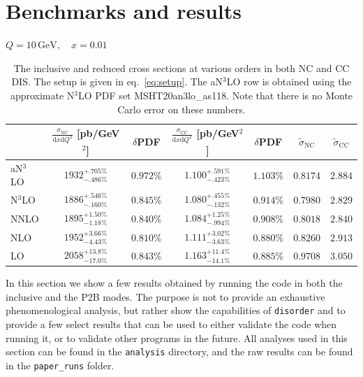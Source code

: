\documentclass[submission, PhysCodeb]{SciPost}
\newcommand{\disorder}{{\tt disorder}}
\newcommand{\dd}{\mathrm{d}}
\newcommand{\NC}{\mathrm{NC}}
\newcommand{\CC}{\mathrm{CC}}
\newcommand{\GEV}{\,\mathrm{GeV}}
\newcommand{\NNNLO}{N$^3$LO}
\begin{document}
\section{Benchmarks and results}
\label{sec:results}
\begin{table}[t] 
  \centering
  \phantom{x}\medskip
  \begin{center} $Q = 10\GEV,\quad x = 0.01$\end{center}
  {\renewcommand{\arraystretch}{1.2}
  \begin{tabular}{lcccc|cc}
    \toprule
    & $\frac{\sigma_\NC}{\dd x \dd Q^2}$ [pb/GeV$^2$] & $\delta$PDF & $\frac{\sigma_\CC}{\dd x \dd Q^2}$ [pb/GeV$^2$] & $\delta$PDF & $\tilde{\sigma}_\NC$  & $\tilde{\sigma}_\CC$ \\ 
    \midrule
    a\NNNLO & $1932^{+.705\%}_{-.486\%}$ & $0.972\%$ & $1.100^{+.591\%}_{-.423\%}$ & $1.103\%$ & $0.8174$ & $2.884$\\    
    \NNNLO  & $1886^{+.546\%}_{-.160\%}$ & $0.845\%$ & $1.080^{+.455\%}_{-.132\%}$ & $0.914\%$ & $0.7980$ & $2.829$\\    
    NNLO    & $1895^{+1.50\%}_{-1.18\%}$ & $0.840\%$ & $1.084^{+1.25\%}_{-.994\%}$ & $0.908\%$ & $0.8018$ & $2.840$\\    
    NLO     & $1952^{+3.66\%}_{-4.43\%}$ & $0.810\%$ & $1.111^{+3.02\%}_{-3.63\%}$ & $0.880\%$ & $0.8260$ & $2.913$\\    
    LO      & $2058^{+13.8\%}_{-17.0\%}$ & $0.843\%$ & $1.163^{+11.4\%}_{-14.1\%}$ & $0.885\%$ & $0.9708$ & $3.050$\\    
    \bottomrule
  \end{tabular}}
  \caption{The inclusive and reduced cross sections at various orders
    in both NC and CC DIS. The setup is given in
    eq.~\eqref{eq:setup}. The a\NNNLO{} row is obtained using the
    approximate \NNNLO{} PDF set MSHT20an3lo\_as118. Note that there
    is no Monte Carlo error on these numbers.}
\label{tab:cross-sections}
\end{table}
In this section we show a few results obtained by running the code in
both the inclusive and the P2B modes. The purpose is not to provide an
exhaustive phenomenological analysis, but rather show the capabilities
of \disorder{} and to provide a few select results that can be used to
either validate the code when running it, or to validate other
programs in the future. All analyses used in this section can be found
in the {\tt analysis} directory, and the raw results can be found in
the {\tt paper\_runs} folder.
\end{document}
